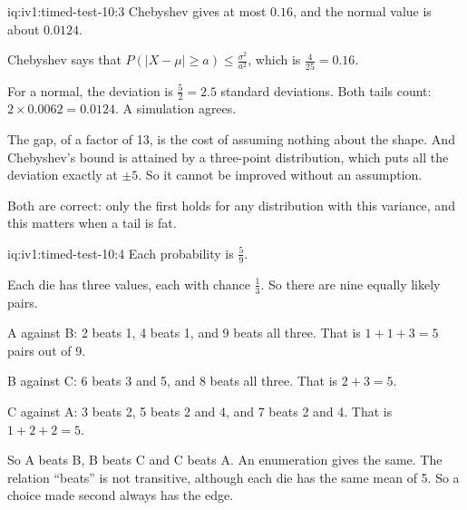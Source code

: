 \begin{solution}{iq:iv1:timed-test-10:3}
Chebyshev gives at most $0.16$, and the normal value is about $0.0124$.

Chebyshev says that $P(|X - \mu| \ge a) \le \frac{\sigma^2}{a^2}$, which is $\frac{4}{25} = 0.16$.

For a normal, the deviation is $\frac52 = 2.5$ standard deviations. Both tails count: $2 \times 0.0062 = 0.0124$. A simulation agrees.

The gap, of a factor of 13, is the cost of assuming nothing about the shape. And Chebyshev's bound is attained by a three-point distribution, which puts all the deviation exactly at $\pm5$. So it cannot be improved without an assumption.

Both are correct: only the first holds for any distribution with this variance, and this matters when a tail is fat.

\end{solution}

\begin{solution}{iq:iv1:timed-test-10:4}
Each probability is $\frac59$.

Each die has three values, each with chance $\frac13$. So there are nine equally likely pairs.

A against B: 2 beats 1, 4 beats 1, and 9 beats all three. That is $1 + 1 + 3 = 5$ pairs out of 9.

B against C: 6 beats 3 and 5, and 8 beats all three. That is $2 + 3 = 5$.

C against A: 3 beats 2, 5 beats 2 and 4, and 7 beats 2 and 4. That is $1 + 2 + 2 = 5$.

So A beats B, B beats C and C beats A. An enumeration gives the same. The relation ``beats'' is not transitive, although each die has the same mean of 5. So a choice made second always has the edge.

\end{solution}

